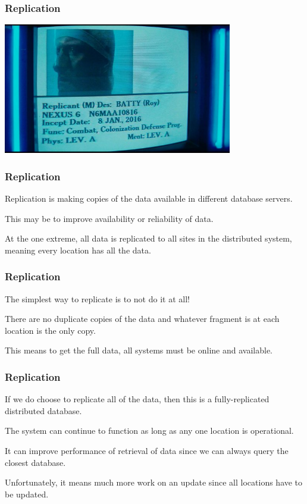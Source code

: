 \begin{frame}
\frametitle{Replication}

\begin{center}
	\includegraphics[width=0.75\textwidth]{images/roybatty.jpg}
\end{center}


\end{frame}

\begin{frame}
\frametitle{Replication}

Replication is making copies of the data available in different database servers. 

This may be to improve availability or reliability of data. 

At the one extreme, all data is replicated to all sites in the distributed system, meaning every location has all the data.

\end{frame}

\begin{frame}
\frametitle{Replication}

The simplest way to replicate is to not do it at all! 

There are no duplicate copies of the data and whatever fragment is at each location is the only copy. 

This means to get the full data, all systems must be online and available. 

\end{frame}


\begin{frame}
\frametitle{Replication}

If we do choose to replicate all of the data, then this is a fully-replicated distributed database.

The system can continue to function as long as any one location is operational.

It can improve performance of retrieval of data since we can always query the closest database. 

Unfortunately, it means much more work on an update since all locations have to be updated.

\end{frame}


